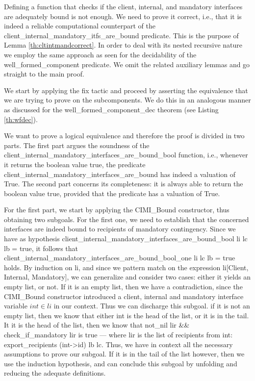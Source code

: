	
	Defining a function that checks if the \textsf{client}, \textsf{internal}, and \textsf{mandatory}
	\textsf{interface}s are adequately bound is not enough. We need to prove it correct, i.e., that it is
	indeed a reliable computational counterpart of the \textsf{client\_internal\_mandatory\_itfs\_are\_bound} 
	predicate. This is the purpose of Lemma	\ref{th:cltintmandcorrect}. In order to deal with its nested recursive
	nature we employ the same approach as seen for the decidability of the \textsf{well\_formed\_component} predicate.
	We omit the related auxiliary lemmas	and go straight to the main proof.		
	
	\begin{lemma} \label{th:cltintmandcorrect} 
			
		
		We start by applying the \textsf{fix} tactic and proceed by asserting the equivalence
	that we are trying to prove on the sub\textsf{component}s. We do this in an analogous
	manner as discussed for the \textsf{well\_formed\_component\_dec} theorem (see Listing \ref{th:wfdec}).
				
		We want to prove a logical equivalence and therefore the proof is divided in two parts. 
	The first part argues the soundness of the 
	\textsf{client_internal_mandatory_interfaces_are_bound_bool} function, i.e., 
	whenever it returns the boolean value true, the predicate \textsf{client_internal_mandatory_interfaces_are_bound}
	has indeed a valuation of True. The second part concerns its completeness: it is always able
	to return the boolean value true, provided that the predicate has a valuation of True.
	
		For the first part, we start by applying the \textsf{CIMI_Bound}	 constructor, thus obtaining two subgoals.
	For the first one, we need to establish that the concerned \textsf{interface}s are indeed bound to recipients
	of \textsf{mandatory} \textsf{contingency}. Since we have as hypothesis 
	\textsf{client_internal_mandatory_interfaces_are_bound_bool li lc lb = true}, it follows that
	\textsf{client_internal_mandatory_interfaces_are_bound_bool_one li lc lb = true} holds.
	By induction on \textsf{li}, and since we pattern match on the expression \textsf{li[Client, Internal, Mandatory]},
	we can generalize and consider two cases: either it yields an empty list,
	or not. If it is an empty list, then we have a contradiction, since
	the \textsf{CIMI_Bound} constructor introduced a \textsf{client}, \textsf{internal} and \textsf{mandatory}
	\textsf{interface} variable \textsf{$int \in li$} in our context. Thus we can discharge this subgoal.
	if it is not an empty list,	then we know that either \textsf{int} is the head of the list, or it is
	in the tail.  It it is the head of the list,  then we know that \textsf{not_nil lir \&\& check_if_mandatory lir}
	is true --- where \textsf{lir} is the list of recipients from \textsf{int}: \textsf{export_recipients (int->id) lb lc}.    
	Thus, we have in context all the necessary assumptions to prove our subgoal.	If it is in the tail of the list however,
	then we use the induction hypothesis, and can conclude this subgoal by unfolding and reducing the 
	adequate definitions.
	

\end{lemma}
